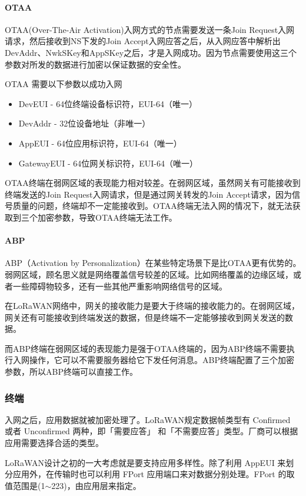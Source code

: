 \documentclass[scheme=chinese,a4paper]{article}
\begin{document}
\paragraph{OTAA}
OTAA(Over-The-Air Activation)入网方式的节点需要发送一条Join Request入网请求，然后接收到NS下发的Join Accept入网应答之后，从入网应答中解析出DevAddr、NwkSKey和AppSKey之后，才是入网成功。因为节点需要使用这三个参数对所发的数据进行加密以保证数据的安全性。

OTAA 需要以下参数以成功入网
\begin{itemize}
  \item DevEUI - 64位终端设备标识符，EUI-64（唯一）
  \item DevAddr - 32位设备地址（非唯一）
  \item AppEUI - 64位应用标识符，EUI-64（唯一）
  \item GatewayEUI - 64位网关标识符，EUI-64（唯一）
\end{itemize}

OTAA终端在弱网区域的表现能力相对较差。在弱网区域，虽然网关有可能接收到终端发送的Join Request入网请求，但是通过网关转发的Join Accept请求，因为信号质量的问题，终端却不一定能接收到。OTAA终端无法入网的情况下，就无法获取到三个加密参数，导致OTAA终端无法工作。
\paragraph{ABP}
 ABP（Activation by Personalization）在某些特定场景下是比OTAA更有优势的。弱网区域，顾名思义就是网络覆盖信号较差的区域。比如网络覆盖的边缘区域，或者一些障碍物较多，还有一些其他严重影响网络信号的区域。

在LoRaWAN网络中，网关的接收能力是要大于终端的接收能力的。在弱网区域，网关还有可能接收到终端发送的数据，但是终端不一定能够接收到网关发送的数据。

而ABP终端在弱网区域的表现能力是强于OTAA终端的，因为ABP终端不需要执行入网操作，它可以不需要服务器给它下发任何消息。ABP终端配置了三个加密参数，所以ABP终端可以直接工作。
\subsubsection{终端}
入网之后，应用数据就被加密处理了。LoRaWAN规定数据帧类型有 Confirmed 或者 Unconfirmed 两种，即「需要应答」 和「不需要应答」类型。厂商可以根据应用需要选择合适的类型。

LoRaWAN设计之初的一大考虑就是要支持应用多样性。除了利用 AppEUI 来划分应用外，在传输时也可以利用 FPort 应用端口来对数据分别处理。FPort 的取值范围是(1$\sim$223)，由应用层来指定。
\end{document}
